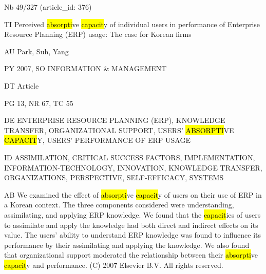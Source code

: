 \documentclass[a4paper]{article}
\begin{document}
\vspace*{-2cm}
Nb \tabto{0cm}49/327 (article\_id: 376)\par
TI \tabto{0cm}Perceived \hl{absorpti}ve \hl{capacit}y of individual users in performance of Enterprise Resource Planning (ERP) usage: The case for Korean firms\par
AU \tabto{0cm}Park, Suh, Yang\par
PY \tabto{0cm}2007, SO INFORMATION \& MANAGEMENT\par
DT \tabto{0cm}Article\par
PG \tabto{0cm}13, NR 67, TC 55\par
DE \tabto{0cm}ENTERPRISE RESOURCE PLANNING (ERP), KNOWLEDGE TRANSFER, ORGANIZATIONAL SUPPORT, USERS' \hl{ABSORPTI}VE \hl{CAPACIT}Y, USERS' PERFORMANCE OF ERP USAGE\par
ID \tabto{0cm}ASSIMILATION, CRITICAL SUCCESS FACTORS, IMPLEMENTATION, INFORMATION-TECHNOLOGY, INNOVATION, KNOWLEDGE TRANSFER, ORGANIZATIONS, PERSPECTIVE, SELF-EFFICACY, SYSTEMS\par
AB \tabto{0cm}We examined the effect of \hl{absorpti}ve \hl{capacit}y of users on their use of ERP in a Korean context. The three components considered were understanding, assimilating, and applying ERP knowledge. We found that the \hl{capacit}ies of users to assimilate and apply the knowledge had both direct and indirect effects on its value. The users' ability to understand ERP knowledge was found to influence its performance by their assimilating and applying the knowledge. We also found that organizational support moderated the relationship between their \hl{absorpti}ve \hl{capacit}y and performance. (C) 2007 Elsevier B.V. All rights reserved.\par
\clearpage
\end{document}
